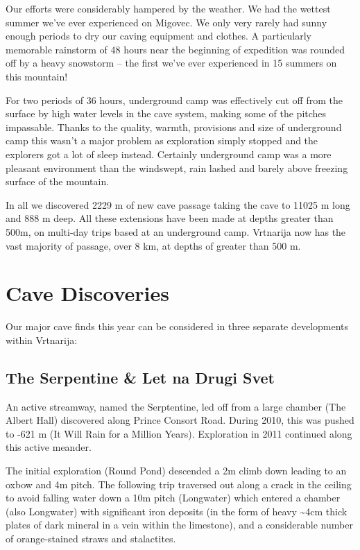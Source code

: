 Our efforts were considerably hampered by the weather. We had the
wettest summer we've ever experienced on Migovec. We only very rarely
had sunny enough periods to dry our caving equipment and clothes. A
particularly memorable rainstorm of 48 hours near the beginning of
expedition was rounded off by a heavy snowstorm -- the first we've ever
experienced in 15 summers on this mountain!

For two periods of 36 hours, underground camp was effectively cut off
from the surface by high water levels in the cave system, making some of
the pitches impassable. Thanks to the quality, warmth, provisions and
size of underground camp this wasn't a major problem as exploration
simply stopped and the explorers got a lot of sleep instead. Certainly
underground camp was a more pleasant environment than the windswept,
rain lashed and barely above freezing surface of the mountain.

In all we discovered 2229 m of new cave passage taking the cave to 11025
m long and 888 m deep. All these extensions have been made at depths
greater than 500m, on multi-day trips based at an underground camp.
Vrtnarija now has the vast majority of passage, over 8 km, at depths of
greater than 500 m.

\section{Cave Discoveries}\label{cave-discoveries}

Our major cave finds this year can be considered in three separate
developments within Vrtnarija:

\subsection{The Serpentine \& Let na Drugi
Svet}\label{the-serpentine-let-na-drugi-svet}

An active streamway, named the Serptentine, led off from a large chamber
(The Albert Hall) discovered along Prince Consort Road. During 2010,
this was pushed to -621 m (It Will Rain for a Million Years).
Exploration in 2011 continued along this active meander.

The initial exploration (Round Pond) descended a 2m climb down leading
to an oxbow and 4m pitch. The following trip traversed out along a crack
in the ceiling to avoid falling water down a 10m pitch (Longwater) which
entered a chamber (also Longwater) with significant iron deposits (in
the form of heavy \textasciitilde{}4cm thick plates of dark mineral in a
vein within the limestone), and a considerable number of orange-stained
straws and stalactites.

